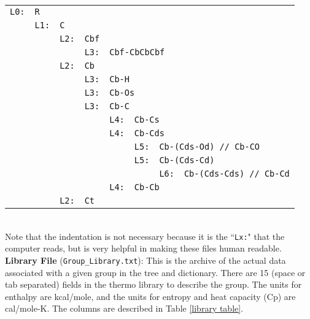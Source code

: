 \documentclass[12pt,letterpaper]{article}
\begin{document}
\begin{tabular}{llllllll}
\texttt{L0:} & \texttt{R} & & & & & & \\
             & \texttt{L1:} & \texttt{C} & & & & & \\
             &              & \texttt{L2:} & \texttt{Cbf} & & & & \\
             &              &              & \texttt{L3:}  & \multicolumn{3}{l}{\texttt{Cbf-CbCbCbf}} & \\
             &              & \texttt{L2:} & \texttt{Cb}  & & & & \\
             &              &              & \texttt{L3:}  & \multicolumn{2}{l}{\texttt{Cb-H}} & & \\
             &              &              & \texttt{L3:}  & \multicolumn{2}{l}{\texttt{Cb-Os}} & & \\
             &              &              & \texttt{L3:}  & \multicolumn{2}{l}{\texttt{Cb-C}} & & \\
             &              &              & & \texttt{L4:}  & \multicolumn{2}{l}{\texttt{Cb-Cs}} & \\
	     &              &              & & \texttt{L4:}  & \multicolumn{2}{l}{\texttt{Cb-Cds}} & \\
	     &              &              & & & \texttt{L5:}  & \multicolumn{2}{l}{\texttt{Cb-(Cds-Od) // Cb-CO}} \\
	     &              &              & & & \texttt{L5:}  & \multicolumn{2}{l}{\texttt{Cb-(Cds-Cd)}} \\
	     &              &              & & & & \texttt{L6:}  & \texttt{Cb-(Cds-Cds) // Cb-Cd} \\
             &              &              & & \texttt{L4:}  & \multicolumn{2}{l}{\texttt{Cb-Cb}} & \\
             &              & \texttt{L2:} & \texttt{Ct} & & & & \\
\end{tabular} \\

Note that the indentation is not necessary because it is the ``\texttt{Lx:}" that
the computer reads, but is very helpful in making these files human readable.\\

\textbf{Library File} (\texttt{Group\_Library.txt}): This is the archive of the actual data
associated with a given group in the tree and dictionary. There are 15 (space
or tab separated) fields in the thermo library to describe the group. The
units for enthalpy are kcal/mole, and the units for entropy and heat capacity
(Cp) are cal/mole-K. The columns are described in Table \ref{library table}.\\
\end{document}
